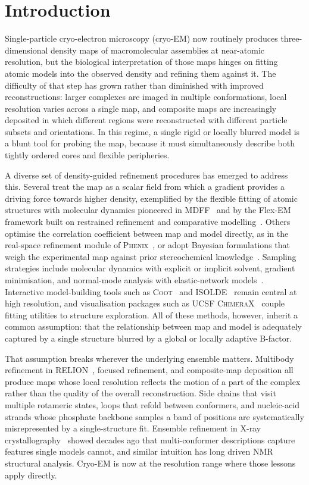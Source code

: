 \documentclass[11pt]{article}
\begin{document}
\section{Introduction}
Single-particle cryo-electron microscopy (cryo-EM) now routinely produces three-dimensional density maps of macromolecular assemblies at near-atomic resolution, but the biological interpretation of those maps hinges on fitting atomic models into the observed density and refining them against it. The difficulty of that step has grown rather than diminished with improved reconstructions: larger complexes are imaged in multiple conformations, local resolution varies across a single map, and composite maps are increasingly deposited in which different regions were reconstructed with different particle subsets and orientations. In this regime, a single rigid or locally blurred model is a blunt tool for probing the map, because it must simultaneously describe both tightly ordered cores and flexible peripheries.

A diverse set of density-guided refinement procedures has emerged to address this. Several treat the map as a scalar field from which a gradient provides a driving force towards higher density, exemplified by the flexible fitting of atomic structures with molecular dynamics pioneered in MDFF~\cite{trabuco2008} and by the Flex-EM framework built on restrained refinement and comparative modelling~\cite{topf2008}. Others optimise the correlation coefficient between map and model directly, as in the real-space refinement module of \textsc{Phenix}~\cite{afonine2018,liebschner2019}, or adopt Bayesian formulations that weigh the experimental map against prior stereochemical knowledge~\cite{bonomi2018}. Sampling strategies include molecular dynamics with explicit or implicit solvent, gradient minimisation, and normal-mode analysis with elastic-network models~\cite{tama2004}. Interactive model-building tools such as \textsc{Coot}~\cite{emsley2010} and \textsc{ISOLDE}~\cite{croll2018} remain central at high resolution, and visualisation packages such as \textsc{UCSF ChimeraX}~\cite{goddard2018,pettersen2021} couple fitting utilities to structure exploration. All of these methods, however, inherit a common assumption: that the relationship between map and model is adequately captured by a single structure blurred by a global or locally adaptive B-factor.

That assumption breaks wherever the underlying ensemble matters. Multibody refinement in \textsc{RELION}~\cite{nakane2018}, focused refinement, and composite-map deposition all produce maps whose local resolution reflects the motion of a part of the complex rather than the quality of the overall reconstruction. Side chains that visit multiple rotameric states, loops that refold between conformers, and nucleic-acid strands whose phosphate backbone samples a band of positions are systematically misrepresented by a single-structure fit. Ensemble refinement in X-ray crystallography~\cite{levin2007,burnley2012} showed decades ago that multi-conformer descriptions capture features single models cannot, and similar intuition has long driven NMR structural analysis. Cryo-EM is now at the resolution range where those lessons apply directly.
\end{document}
